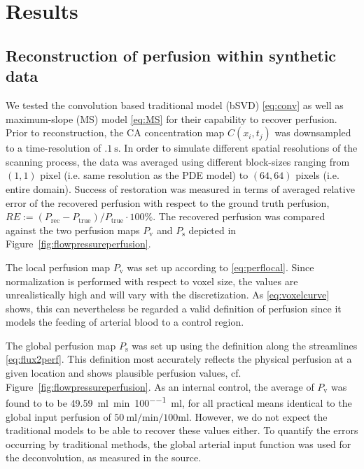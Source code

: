 \documentclass[journal,twocolumn]{IEEEtran}
\newcommand{\Perf}{P}
\newcommand{\Perfv}{P_{\mathrm{v}}}
\newcommand{\Perfs}{P_{\mathrm{s}}}
\newcommand{\siPml}{\milli\litre\per\minute\per100\milli\litre}
\begin{document}
	\section{Results}	
	\subsection{Reconstruction of perfusion within synthetic data}\label{sec:RecPhantom}


	We tested the convolution based traditional model (bSVD) \eqref{eq:conv} as well as maximum-slope (MS) model \eqref{eq:MS} for their capability to recover perfusion.
	Prior to reconstruction, the CA concentration map $C(x_i,t_j)$ was downsampled to a time-resolution of $\SI{.1}{\second}$.
	In order to simulate different spatial resolutions of the scanning process, the data was averaged using different block-sizes ranging from $(1,1)$ pixel (i.e. same resolution as the PDE model) to $(64,64)$ pixels (i.e. entire domain).		
	Success of restoration was measured in terms of averaged relative error of the recovered perfusion with respect to the ground truth perfusion, $RE :=  (\Perf_{\mathrm{rec}} - \Perf_{\mathrm{true}})/\Perf_{\mathrm{true}}\cdot 100\%$.
	The recovered perfusion was compared against the two perfusion maps $\Perfv$ and $\Perfs$ depicted in Figure~\ref{fig:flowpressureperfusion}.
	
	The local perfusion map $\Perfv$ was set up according to \eqref{eq:perflocal}. 
	Since normalization is performed with respect to voxel size, the values are unrealistically high and will vary with the discretization.
	As \eqref{eq:voxelcurve} shows, this can nevertheless be regarded a valid definition of perfusion since it models the feeding of arterial blood to a control region.
	
	The global perfusion map $\Perfs$ was set up using the definition along the streamlines \eqref{eq:flux2perf}.
	This definition most accurately reflects the physical perfusion at a given location and shows plausible perfusion values, cf. Figure~\ref{fig:flowpressureperfusion}. As an internal control, the average of $\Perfv$ was found to to be \SI{49.59}{\siPml}, for all practical means identical to the global input perfusion of $\SI{50}{\siPml}$.
	However, we do not expect the traditional models to be able to recover these values either.
	To quantify the errors occurring by traditional methods, the global arterial input function was used for the deconvolution, as measured in the source.
	
\end{document}
